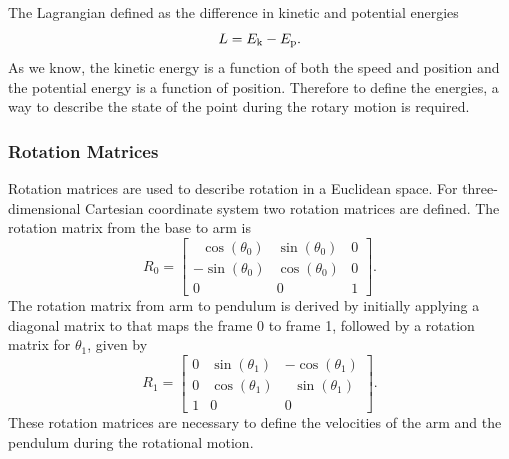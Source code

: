 The Lagrangian defined as the difference in kinetic and potential energies
\begin{equation}
L = E _{\text{k}} - E _{\text{p}}.
\end{equation}
As we know, the kinetic energy is a function of both the speed and position and the potential energy is a function of position. Therefore to define the energies, a way to describe the state of the point during the rotary motion is required.
\subsubsection{Rotation Matrices}
Rotation matrices are used to describe rotation in a Euclidean space. For three-dimensional Cartesian coordinate system two rotation matrices are defined.
The rotation matrix from the base to arm is
\begin{equation}
	R_0 = 	\begin{bmatrix}
					\ \ \,\cos(\theta_0) & \sin(\theta_0) & 0\\
					-\sin(\theta_0) & \cos(\theta_0) & 0\\
					0 & 0 & 1
				\end{bmatrix}.
\end{equation}
The rotation matrix from arm to pendulum is derived by
initially applying a diagonal matrix to that maps the frame
0 to frame 1, followed by a rotation matrix for $\theta_1$, given by
\begin{equation}
R_1 = 	\begin{bmatrix}
			0 & \sin(\theta_1) & -\cos(\theta_1)\\
			0 & \cos(\theta_1) & \ \ \,\sin(\theta_1)\\
			1 & 0 & 0                      
		\end{bmatrix}.
\end{equation}
These rotation matrices are necessary to define the velocities of the arm and the pendulum during the rotational motion. 
